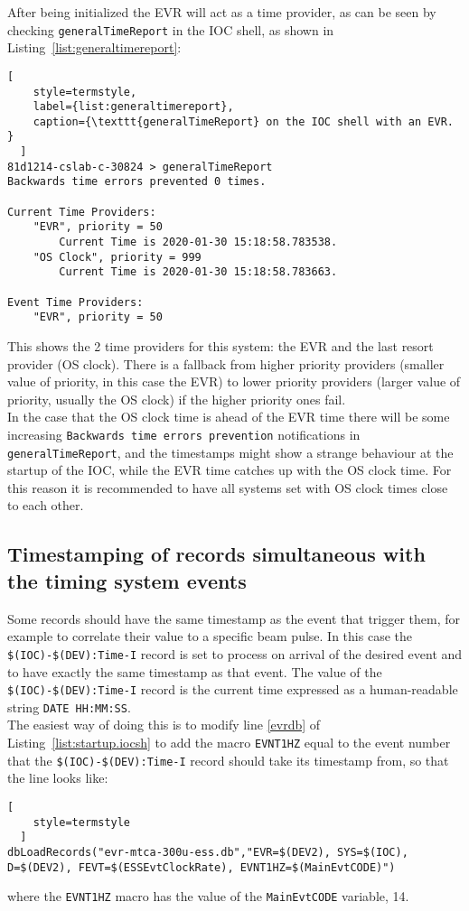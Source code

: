 \documentclass[11pt
  , a4paper
  , article
  , oneside
  , showtrims
]{memoir}
\begin{document}
After being initialized the EVR will act as a time provider, as can be seen by checking \texttt{generalTimeReport} in the IOC shell, as shown in Listing~\ref{list:generaltimereport}:
\begin{lstlisting}[
    style=termstyle,
    label={list:generaltimereport},
    caption={\texttt{generalTimeReport} on the IOC shell with an EVR. }
  ]
81d1214-cslab-c-30824 > generalTimeReport
Backwards time errors prevented 0 times.

Current Time Providers:
    "EVR", priority = 50
        Current Time is 2020-01-30 15:18:58.783538.
    "OS Clock", priority = 999
        Current Time is 2020-01-30 15:18:58.783663.

Event Time Providers:
    "EVR", priority = 50

\end{lstlisting}
This shows the 2 time providers for this system: the EVR and the last resort provider (OS clock). There is a fallback from higher priority providers (smaller value of priority, in this case the EVR) to lower priority providers (larger value of priority, usually the OS clock) if the higher priority ones fail.\\

In the case that the OS clock time is ahead of the EVR time there will be some increasing \texttt{Backwards time errors prevention} notifications in \texttt{generalTimeReport}, and the timestamps might show a strange behaviour at the startup of the IOC, while the EVR time catches up with the OS clock time. For this reason it is recommended to have all systems set with OS clock times close to each other.\\

\subsection{Timestamping of records simultaneous with the timing system events}
Some records should have the same timestamp as the event that trigger them, for example to correlate their value to a specific beam pulse. In this case the \texttt{\$(IOC)-\$(DEV):Time-I} record is set to process on arrival of the desired event and to have exactly the same timestamp as that event. The value of the  \texttt{\$(IOC)-\$(DEV):Time-I} record is the current time expressed as a human-readable string \texttt{DATE HH:MM:SS}.\\

The easiest way of doing this is to modify line \ref{evrdb} of Listing~\ref{list:startup.iocsh} to add the macro \texttt{EVNT1HZ} equal to the event number that the \texttt{\$(IOC)-\$(DEV):Time-I} record should take its timestamp from, so that the line looks like:
\begin{lstlisting}[
    style=termstyle
  ]
dbLoadRecords("evr-mtca-300u-ess.db","EVR=$(DEV2), SYS=$(IOC), D=$(DEV2), FEVT=$(ESSEvtClockRate), EVNT1HZ=$(MainEvtCODE)")
\end{lstlisting}
where the \texttt{EVNT1HZ} macro has the value of the \texttt{MainEvtCODE} variable, 14.\\
\end{document}
